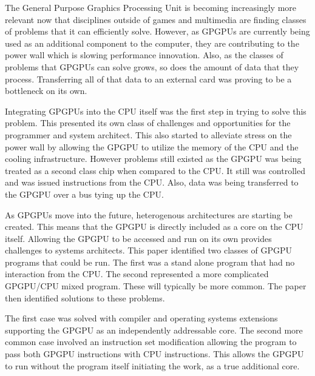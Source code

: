 The General Purpose Graphics Processing Unit is becoming increasingly more relevant now that disciplines outside of games and multimedia are finding classes of problems that it can efficiently solve. However, as GPGPUs are currently being used as an additional component to the computer, they are contributing to the power wall which is slowing performance innovation. Also, as the classes of problems that GPGPUs can solve grows, so does the amount of data that they process. Transferring all of that data to an external card was proving to be a bottleneck on its own. 

Integrating GPGPUs into the CPU itself was the first step in trying to solve this problem. This presented its own class of challenges and opportunities for the programmer and system architect. This also started to alleviate stress on the power wall by allowing the GPGPU to utilize the memory of the CPU and the cooling infrastructure. However problems still existed as the GPGPU was being treated as a second class chip when compared to the CPU. It still was controlled and was issued instructions from the CPU. Also, data was being transferred to the GPGPU over a bus tying up the CPU.

As GPGPUs move into the future, heterogenous architectures are starting be created. This means that the GPGPU is directly included as a core on the CPU itself. Allowing the GPGPU to be accessed and run on its own provides challenges to systems architects. This paper identified two classes of GPGPU programs that could be run. The first was a stand alone program that had no interaction from the CPU. The second represented a more complicated GPGPU/CPU mixed program. These will typically be more common. The paper then identified solutions to these problems. 

The first case was solved with compiler and operating systems extensions supporting the GPGPU as an independently addressable core. The second more common case involved an instruction set modification allowing the program to pass both GPGPU instructions with CPU instructions. This allows the GPGPU to run without the program itself initiating the work, as a true additional core. 